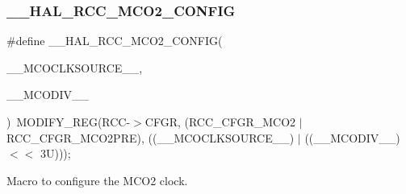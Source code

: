 \subsubsection{\texorpdfstring{\+\_\+\+\_\+\+H\+A\+L\+\_\+\+R\+C\+C\+\_\+\+M\+C\+O2\+\_\+\+C\+O\+N\+F\+IG}{\_\_HAL\_RCC\_MCO2\_CONFIG}}
{\footnotesize\ttfamily \#define \+\_\+\+\_\+\+H\+A\+L\+\_\+\+R\+C\+C\+\_\+\+M\+C\+O2\+\_\+\+C\+O\+N\+F\+IG(\begin{DoxyParamCaption}\item[{}]{\+\_\+\+\_\+\+M\+C\+O\+C\+L\+K\+S\+O\+U\+R\+C\+E\+\_\+\+\_\+,  }\item[{}]{\+\_\+\+\_\+\+M\+C\+O\+D\+I\+V\+\_\+\+\_\+ }\end{DoxyParamCaption})~M\+O\+D\+I\+F\+Y\+\_\+\+R\+EG(R\+CC-\/$>$C\+F\+GR, (R\+C\+C\+\_\+\+C\+F\+G\+R\+\_\+\+M\+C\+O2 $\vert$ R\+C\+C\+\_\+\+C\+F\+G\+R\+\_\+\+M\+C\+O2\+P\+RE), ((\+\_\+\+\_\+\+M\+C\+O\+C\+L\+K\+S\+O\+U\+R\+C\+E\+\_\+\+\_\+) $\vert$ ((\+\_\+\+\_\+\+M\+C\+O\+D\+I\+V\+\_\+\+\_\+) $<$$<$ 3\+U)));}



Macro to configure the M\+C\+O2 clock. 


